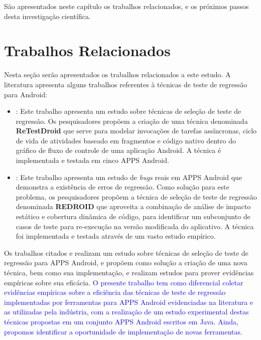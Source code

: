 \acresetall
São apresentados neste capítulo os trabalhos relacionados, e os próximos passos desta investigação científica.

\section{Trabalhos Relacionados}

Nesta seção serão apresentados os trabalhos relacionados a este estudo. A literatura apresenta alguns trabalhos referentes à técnicas de teste de regressão para Android:

\begin{itemize}
    
    \item \cite{8377661}: Este trabalho apresenta um estudo sobre técnicas de seleção de teste de regressão. Os pesquisadores propõem a criação de uma técnica denominada \textbf{ReTestDroid} que serve para modelar invocações de tarefas assíncronas, ciclo de vida de atividades baseado em fragmentos e código nativo dentro do gráfico de fluxo de controle de uma aplicação Android. A técnica é implementada e testada em cinco \ac{APPS} Android.
    
    \item \cite{Do2016RedroidAR}: Este trabalho apresenta um estudo de \textit{bugs} reais em \ac{APPS} Android que demonstra a existência de erros de regressão. Como solução para este problema, os pesquisadores propõem a técnica de seleção de teste de regressão denominada \textbf{REDROID} que aproveita a combinação de análise de impacto estático e cobertura dinâmica de código, para identificar um subconjunto de casos de teste para re-execução na versão modificada do aplicativo. A técnica foi implementada e testada através de um vasto estudo empírico.
    
\end{itemize}
    
    Os trabalhos citados \cite{8377661} e \cite{Do2016RedroidAR} realizam um estudo sobre técnicas de seleção de teste de regressão para \ac{APPS} Android, e propõem como solução a criação de uma nova técnica, bem como sua implementação, e realizam estudos para prover evidências empíricas sobre sua eficácia. \textcolor{blue}{O presente trabalho tem como diferencial coletar evidências empíricas sobre a eficiência das técnicas de teste de regressão implementadas por ferramentas para \ac{APPS} Android evidenciadas na literatura e as utilizadas pela indústria, com a realização de um estudo experimental destas técnicas propostas em um conjunto \ac{APPS} Android escritos em Java. Ainda, propomos identificar a oportunidade de implementação de novas ferramentas.}


